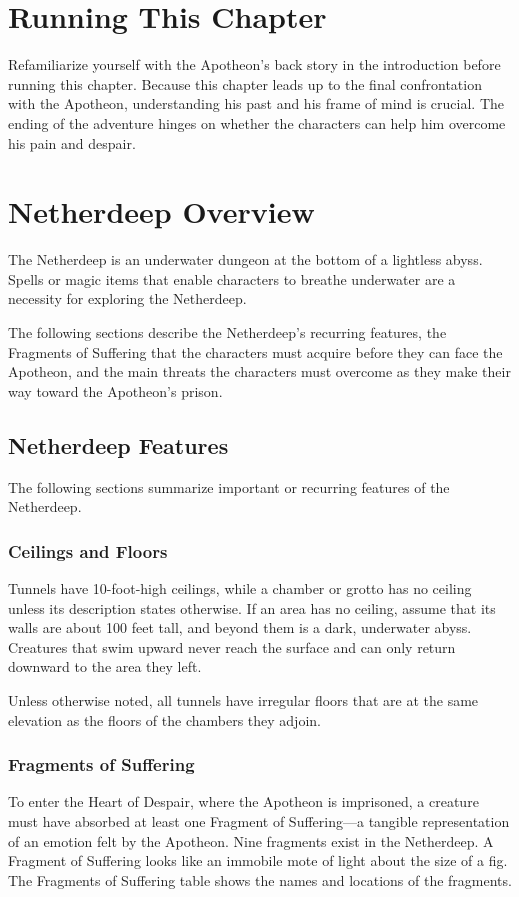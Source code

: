 \documentclass[10pt,a4paper,twoside,fancy,bg=print,twocolumn,openany,nodeprecatedcode]{dndbook}
\begin{document}
\section{Running This Chapter}
Refamiliarize yourself with the Apotheon's back story in the introduction before running this chapter. Because this chapter leads up to the final confrontation with the Apotheon, understanding his past and his frame of mind is crucial. The ending of the adventure hinges on whether the characters can help him overcome his pain and despair.

\section{Netherdeep Overview}
The Netherdeep is an underwater dungeon at the bottom of a lightless abyss. Spells or magic items that enable characters to breathe underwater are a necessity for exploring the Netherdeep.

The following sections describe the Netherdeep's recurring features, the Fragments of Suffering that the characters must acquire before they can face the Apotheon, and the main threats the characters must overcome as they make their way toward the Apotheon's prison.

\subsection{Netherdeep Features}
The following sections summarize important or recurring features of the Netherdeep.

\subsubsection{Ceilings and Floors}
Tunnels have 10-foot-high ceilings, while a chamber or grotto has no ceiling unless its description states otherwise. If an area has no ceiling, assume that its walls are about 100 feet tall, and beyond them is a dark, underwater abyss. Creatures that swim upward never reach the surface and can only return downward to the area they left.

Unless otherwise noted, all tunnels have irregular floors that are at the same elevation as the floors of the chambers they adjoin.

\subsubsection{Fragments of Suffering}
To enter the Heart of Despair, where the Apotheon is imprisoned, a creature must have absorbed at least one Fragment of Suffering—a tangible representation of an emotion felt by the Apotheon. Nine fragments exist in the Netherdeep. A Fragment of Suffering looks like an immobile mote of light about the size of a fig. The Fragments of Suffering table shows the names and locations of the fragments.
\end{document}
